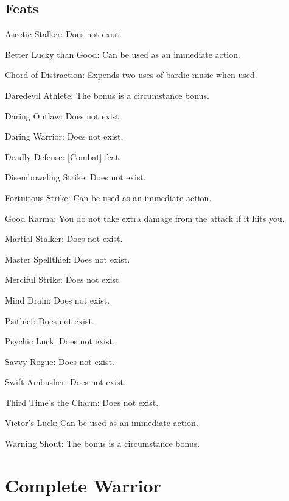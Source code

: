 \subsection{Feats}
\begin{itemize*}
\item Ascetic Stalker: Does not exist. %
\item Better Lucky than Good: Can be used as an immediate action.
\item Chord of Distraction: Expends two uses of bardic music when used.
\item Daredevil Athlete: The bonus is a circumstance bonus.
\item Daring Outlaw: Does not exist. %
\item Daring Warrior: Does not exist. %
\item Deadly Defense: [Combat] feat.
\item Disemboweling Strike: Does not exist.
\item Fortuitous Strike: Can be used as an immediate action.
\item Good Karma: You do not take extra damage from the attack if it hits you.
\item Martial Stalker: Does not exist. %
\item Master Spellthief: Does not exist. %
\item Merciful Strike: Does not exist.
\item Mind Drain: Does not exist. %
\item Psithief: Does not exist. %
\item Psychic Luck: Does not exist. %
\item Savvy Rogue: Does not exist.
\item Swift Ambusher: Does not exist. %
\item Third Time's the Charm: Does not exist.
\item Victor's Luck: Can be used as an immediate action.
\item Warning Shout: The bonus is a circumstance bonus.
\end{itemize*}

\section{Complete Warrior}
